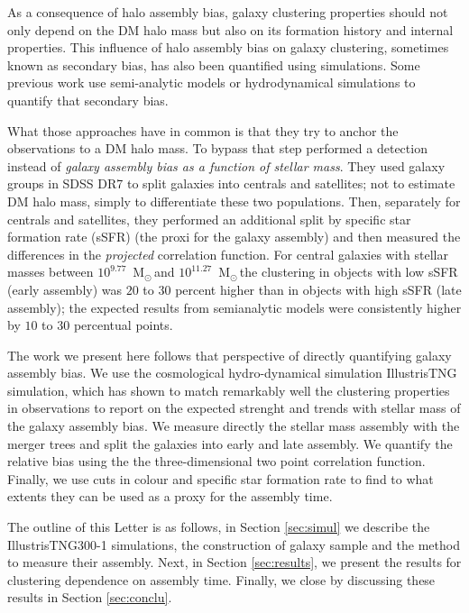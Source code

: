 \documentclass[fleqn,usenatbib]{mnras}
\newcommand{\Msun}{\,{\rm M}$_{\odot}$\,}
\begin{document}
As a consequence of halo assembly bias, galaxy clustering properties should not only depend on
the DM halo mass but also on its formation history and internal
properties.
This influence of halo assembly bias on galaxy clustering, sometimes known as
secondary bias, has also been quantified using simulations. 
Some previous work use semi-analytic models 
\citep{2007MNRAS.374.1303C,2014ApJ...794...74J,2019MNRAS.484.1133C}
or hydrodynamical simulations
\citep{2018MNRAS.480.3978A,2020MNRAS.492.2739X,2020MNRAS.tmp.1844M}
to quantify that secondary bias. 

What those approaches have in common is that they try to anchor the
observations to a DM halo mass. 
To bypass that step \citet{2013MNRAS.433..515W} performed a detection
instead of \emph{galaxy assembly bias as a function of stellar mass}.
They used galaxy groups in SDSS DR7 to split galaxies into centrals
and satellites; not to estimate DM halo mass, simply to differentiate
these two populations.
Then, separately for centrals and satellites, they performed an additional
split by specific star formation rate (sSFR) (the proxi for the galaxy
assembly) and then measured the differences in the \emph{projected} correlation function.
For central galaxies with stellar masses between $10^{9.77}$ \Msun and
$10^{11.27}$ \Msun the clustering in objects with low sSFR (early
assembly) was $20$ to $30$ percent higher than in objects with high
sSFR (late assembly); the expected results from semianalytic models
were consistently higher by $10$ to $30$ percentual points. 

The work we present here follows that perspective of directly
quantifying galaxy assembly bias.
We use the cosmological hydro-dynamical simulation IllustrisTNG simulation,
which has shown to match remarkably well the clustering properties in
observations \citep{2018MNRAS.475..676S} to report on the expected
strenght and trends with stellar mass of the galaxy assembly bias.
We measure directly the stellar mass assembly with the merger trees
and split the galaxies into early and late assembly.
We quantify the relative bias using the the three-dimensional two point
correlation function.
Finally, we use cuts in colour and specific star formation rate to
find to what extents they can be used as a proxy for the assembly
time. 

The outline of this Letter is as follows, in Section \ref{sec:simul}
we describe the IllustrisTNG300-1 simulations, the construction of
galaxy sample and the method to measure their assembly.
Next, in Section \ref{sec:results}, we present the results for
clustering dependence on assembly time.
Finally, we close by discussing these results in Section \ref{sec:conclu}. 
\end{document}

